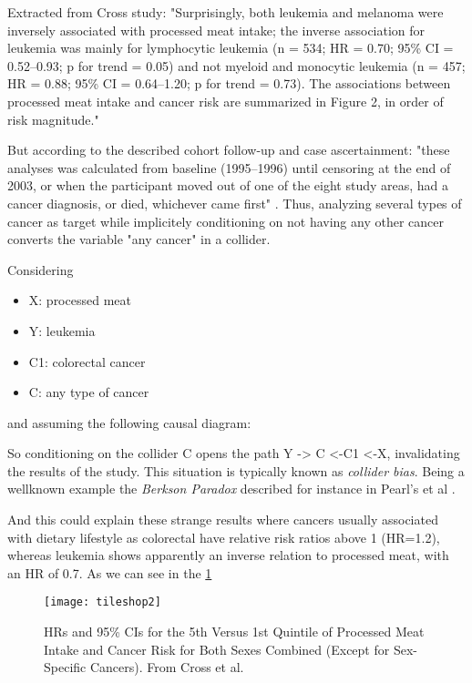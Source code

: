 \documentclass{article}
\begin{document}
Extracted from Cross study: "Surprisingly, both leukemia and melanoma were inversely associated with processed meat intake; the inverse association for leukemia was mainly for lymphocytic leukemia (n = 534; HR = 0.70; 95\% CI = 0.52–0.93; p for trend = 0.05) and not myeloid and monocytic leukemia (n = 457; HR = 0.88; 95\% CI = 0.64–1.20; p for trend = 0.73). The associations between processed meat intake and cancer risk are summarized in Figure 2, in order of risk magnitude."

But according to the described cohort follow-up and case ascertainment: "these analyses was calculated from baseline (1995–1996) until censoring at the end of 2003, or when the participant moved out of one of the eight study areas, had a cancer diagnosis, or died, whichever came first" \cite{cross}. Thus, analyzing several types of cancer as target while implicitely conditioning on not having any other cancer converts the variable "any cancer" in a collider.

Considering
\begin{itemize}
\item X: processed meat
\item Y: leukemia
\item C1: colorectal cancer
\item C: any type of cancer
\end{itemize}

and assuming the following causal diagram:


So conditioning on the collider C opens the path Y -> C <-C1 <-X, invalidating the results of the study. This situation is typically known as \textit{collider bias}. Being a wellknown example the \textit{Berkson Paradox} described for instance in Pearl's et al \cite{bookofwhy}.

And this could explain these strange results where cancers usually associated with dietary lifestyle as colorectal have relative risk ratios above 1 (HR=1.2), whereas leukemia shows apparently an inverse relation to processed meat, with an HR of 0.7. As we can see in the \ref{fig:cross}
\begin{figure}
  \texttt{[image: tileshop2]}
  \caption{HRs and 95\% CIs for the 5th Versus 1st Quintile of Processed Meat Intake and Cancer Risk for Both Sexes Combined (Except for Sex-Specific Cancers). From Cross et al. \cite{cross}}
  \label{fig:cross}
\end{figure}
\end{document}
